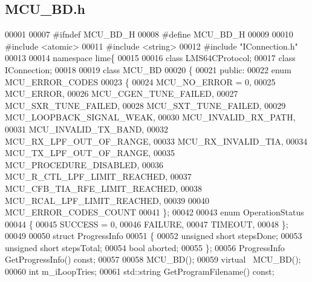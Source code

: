 \subsection{M\+C\+U\+\_\+\+B\+D.\+h}
\label{MCU__BD_8h_source}

\begin{DoxyCode}
00001 
00007 \textcolor{preprocessor}{#ifndef MCU\_BD\_H}
00008 \textcolor{preprocessor}{#define MCU\_BD\_H}
00009 
00010 \textcolor{preprocessor}{#include <atomic>}
00011 \textcolor{preprocessor}{#include <string>}
00012 \textcolor{preprocessor}{#include "IConnection.h"}
00013 
00014 \textcolor{keyword}{namespace }lime\{
00015 
00016 \textcolor{keyword}{class }LMS64CProtocol;
00017 \textcolor{keyword}{class }IConnection;
00018 
00019 \textcolor{keyword}{class }MCU_BD
00020 \{
00021     \textcolor{keyword}{public}:
00022         \textcolor{keyword}{enum} MCU_ERROR_CODES
00023         \{
00024             MCU_NO_ERROR = 0,
00025             MCU_ERROR,
00026             MCU_CGEN_TUNE_FAILED,
00027             MCU_SXR_TUNE_FAILED,
00028             MCU_SXT_TUNE_FAILED,
00029             MCU_LOOPBACK_SIGNAL_WEAK,
00030             MCU_INVALID_RX_PATH,
00031             MCU_INVALID_TX_BAND,
00032             MCU_RX_LPF_OUT_OF_RANGE,
00033             MCU_RX_INVALID_TIA,
00034             MCU_TX_LPF_OUT_OF_RANGE,
00035             MCU_PROCEDURE_DISABLED,
00036             MCU_R_CTL_LPF_LIMIT_REACHED,
00037             MCU_CFB_TIA_RFE_LIMIT_REACHED,
00038             MCU_RCAL_LPF_LIMIT_REACHED,
00039 
00040             MCU_ERROR_CODES_COUNT
00041         \};
00042 
00043         \textcolor{keyword}{enum} OperationStatus
00044         \{
00045             SUCCESS = 0,
00046             FAILURE,
00047             TIMEOUT,
00048         \};
00049 
00050         \textcolor{keyword}{struct }ProgressInfo
00051         \{
00052             \textcolor{keywordtype}{unsigned} \textcolor{keywordtype}{short} stepsDone;
00053             \textcolor{keywordtype}{unsigned} \textcolor{keywordtype}{short} stepsTotal;
00054             \textcolor{keywordtype}{bool} aborted;
00055         \};
00056         ProgressInfo GetProgressInfo() \textcolor{keyword}{const};
00057 
00058         MCU_BD();
00059         \textcolor{keyword}{virtual} ~MCU_BD();
00060         \textcolor{keywordtype}{int} m_iLoopTries;
00061         std::string GetProgramFilename() \textcolor{keyword}{const};

\end{DoxyCode}
